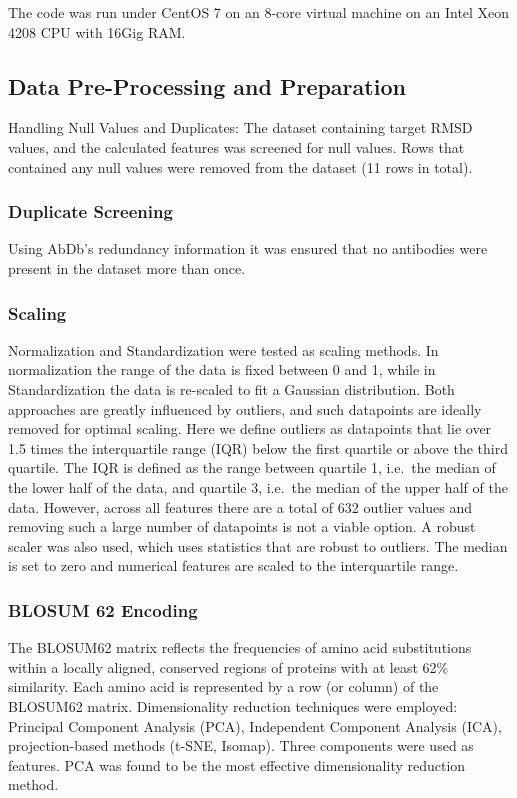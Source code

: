 The code was run under CentOS 7 on an 8-core virtual machine on an
Intel Xeon 4208 CPU with 16Gig RAM.

\subsection{Data Pre-Processing and Preparation}
Handling Null Values and Duplicates: The dataset containing target
RMSD values, and the calculated features was screened for null
values.
Rows that contained any null values were
removed from the dataset (11 rows in total).

\subsubsection{Duplicate Screening}
Using AbDb's redundancy information it was ensured that no antibodies
were present in the dataset more than once.

\subsubsection{Scaling}
Normalization and Standardization were tested as scaling methods. In normalization the range of the data is fixed between 0 and 1, while in Standardization the data is re-scaled to fit a Gaussian distribution. Both
approaches are greatly influenced by outliers, and such datapoints are
ideally removed for optimal scaling. Here we define outliers as
datapoints that lie over 1.5 times the interquartile range (IQR) below
the first quartile or above the third quartile. The IQR is defined as
the range between quartile 1, i.e.\ the median of the lower half of the
data, and quartile 3, i.e.\ the median of the upper half of the
data. However, across all features there are a total of 632 outlier
values and removing such a large number of datapoints is not a viable
option. A robust scaler\cite{XXXX} was also used, which uses statistics that are
robust to outliers. The median is set to zero and numerical features
are scaled to the interquartile range.

\subsubsection{BLOSUM 62 Encoding}
The BLOSUM62 matrix reflects the frequencies of amino acid
substitutions within a locally aligned, conserved regions of proteins
with at least 62\% similarity. Each amino acid is represented by a row
(or column) of the BLOSUM62 matrix. Dimensionality reduction
techniques were employed: Principal Component Analysis (PCA),
Independent Component Analysis (ICA), projection-based methods (t-SNE,
Isomap). Three components were used as features. PCA was found to be the most effective dimensionality reduction method. 

